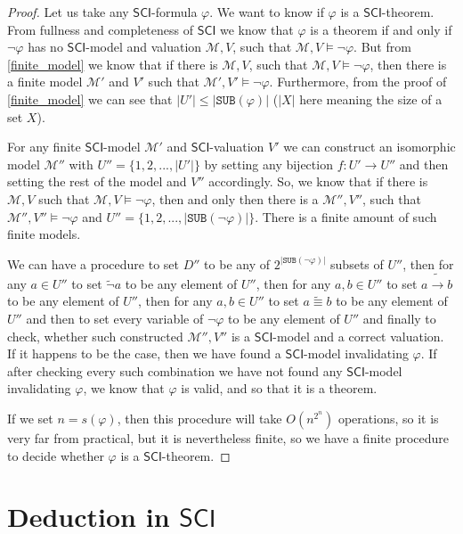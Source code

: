 \documentclass{article}
\theoremstyle{definition}
\theoremstyle{definition}
\theoremstyle{definition}
\newcommand*{\id}{\equiv}
\newcommand*{\ra}{\rightarrow}
\newcommand*{\SUB}{\texttt{SUB}}
\newcommand{\SCI}{$\mathsf{SCI}$\xspace}
\newcommand{\M}{\mathcal{M}\xspace}
\begin{document}
\begin{proof}
    Let us take any \SCI-formula $\varphi$. We want to know if $\varphi$ is a \SCI-theorem. From fullness and completeness of \SCI we know that $\varphi$ is a theorem if and only if $\lnot \varphi$ has no \SCI-model and valuation $\M, V$, such that $\M, V \models \lnot \varphi$. But from \cref{finite_model} we know that if there is $\M, V$, such that $\M, V \models \lnot \varphi$, then there is a finite model $\M'$ and $V'$ such that $\M', V' \models \lnot \varphi$. Furthermore, from the proof of \cref{finite_model} we can see that $|U'| \leq |\SUB(\varphi)|$ ($|X|$ here meaning the size of a set $X$).

    For any finite \SCI-model $\M'$ and \SCI-valuation $V'$ we can construct an
    isomorphic model $\M''$ with $U'' = \{1, 2, ..., |U'|\}$ by setting any
    bijection $f : U' \rightarrow U''$ and then setting the rest of the model and
    $V''$ accordingly. So, we know that if there is $\M, V$ such that $\M, V
        \models \lnot \varphi$, then and only then there is a $\M'', V''$, such that
    $\M'', V'' \models \lnot \varphi$ and $U'' = \{1, 2, ..., |\SUB(\lnot
        \varphi)|\}$. There is a finite amount of such finite models.

    We can have a procedure to set $D''$ to be any of $2^{|\SUB(\lnot \varphi)|}$
    subsets of $U''$, then for any $a \in U''$ to set $\tilde{\lnot}a$ to be any
    element of $U''$, then for any $a, b \in U''$ to set $a \tilde{\ra} b$ to be
    any element of $U''$, then for any $a, b \in U''$ to set $a \tilde{\id} b$ to
    be any element of $U''$ and then to set every variable of $\lnot \varphi$ to be
    any element of $U''$ and finally to check, whether such constructed $\M'', V''$
    is a \SCI-model and a correct valuation. If it happens to be the case, then we
    have found a \SCI-model invalidating $\varphi$. If after checking every such
    combination we have not found any \SCI-model invalidating $\varphi$, we know
    that $\varphi$ is valid, and so that it is a theorem.

    If we set $n = s(\varphi)$, then this procedure will take $O({n} ^ {2^n})$
    operations, so it is very far from practical, but it is nevertheless finite, so
    we have a finite procedure to decide whether $\varphi$ is a \SCI-theorem.

\end{proof}

\section{Deduction in \SCI}
\end{document}
